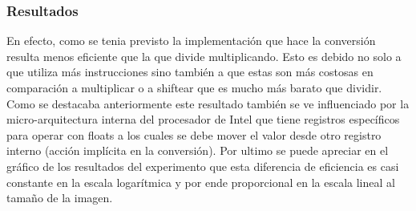 \documentclass[a4paper]{article}
\begin{document}
\subsubsection{Resultados}
\begin{figure}[h!]
    \centering
    \qquad
\end{figure}

En efecto, como se tenia previsto la implementación que hace la conversión resulta menos eficiente que la que divide multiplicando. Esto es debido no solo a que utiliza más instrucciones sino también a que estas son más costosas en comparación a multiplicar o a shiftear que es mucho más barato que dividir. Como se destacaba anteriormente este resultado también se ve influenciado por la micro-arquitectura interna del procesador de Intel que tiene registros específicos para operar con floats a los cuales se debe mover el valor desde otro registro interno (acción implícita en la conversión). Por ultimo se puede apreciar en el gráfico de los resultados del experimento que esta diferencia de eficiencia es casi constante en la escala logarítmica y por ende proporcional en la escala lineal al tamaño de la imagen.
\end{document}
